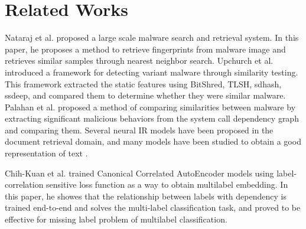 \section{Related Works}


Nataraj et al. \cite{nataraj2013sarvam} proposed a large scale malware search and retrieval system. In this paper, he proposes a method to retrieve fingerprints from malware image and retrieves similar samples through nearest neighbor search. Upchurch et al. \cite{upchurch2015variant} introduced a framework for detecting variant malware through similarity testing. This framework extracted the static features using BitShred, TLSH, sdhash, ssdeep, and compared them to determine whether they were similar malware. Palahan et al. \cite{palahan2013extraction} proposed a method of comparing similarities between malware by extracting significant malicious behaviors from the system call dependency graph and comparing them. Several neural IR models have been proposed in the document retrieval domain, and many models have been studied to obtain a good representation of text \cite{mitra2017learning,cohen2016end,huang2013learning}.

 Chih-Kuan et al. \cite{yeh2017learning} trained Canonical Correlated AutoEncoder models using label-correlation sensitive loss function as a way to obtain multilabel embedding. In this paper, he showes that the relationship between labels with dependency is trained end-to-end and solves the multi-label classification task, and proved to be effective for missing label problem of multilabel classification.
